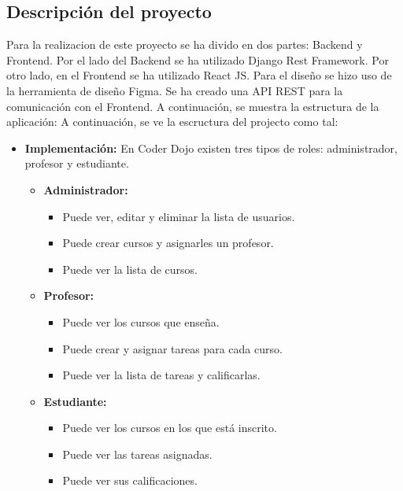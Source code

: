 \documentclass{article}
\begin{document}
\subsection{Descripción del proyecto}
Para la realizacion de este proyecto se ha divido en dos partes:
Backend y Frontend. Por el lado del Backend se ha utilizado Django Rest Framework. Por otro lado, en el Frontend se ha utilizado React JS. Para el diseño se hizo uso de la herramienta de diseño Figma.
Se ha creado una API REST para la comunicación con el Frontend. A continuación, se muestra la estructura de la aplicación:
A continuación, se ve la escructura del projecto como tal:
\begin{itemize}
	\item \textbf{Implementación:} En Coder Dojo existen tres tipos de roles: administrador, profesor y estudiante.
	      \begin{itemize}
		      \item \textbf{Administrador:}
		            \begin{itemize}
			            \item Puede ver, editar y eliminar la lista de usuarios.
			            \item Puede crear cursos y asignarles un profesor.
			            \item Puede ver la lista de cursos.
		            \end{itemize}
		      \item \textbf{Profesor:}
		            \begin{itemize}
			            \item Puede ver los cursos que enseña.
			            \item Puede crear y asignar tareas para cada curso.
			            \item Puede ver la lista de tareas y calificarlas.
		            \end{itemize}
		      \item \textbf{Estudiante:}
		            \begin{itemize}
			            \item Puede ver los cursos en los que está inscrito.
			            \item Puede ver las tareas asignadas.
			            \item Puede ver sus calificaciones.
		            \end{itemize}
	      \end{itemize}
\end{itemize}
\end{document}
